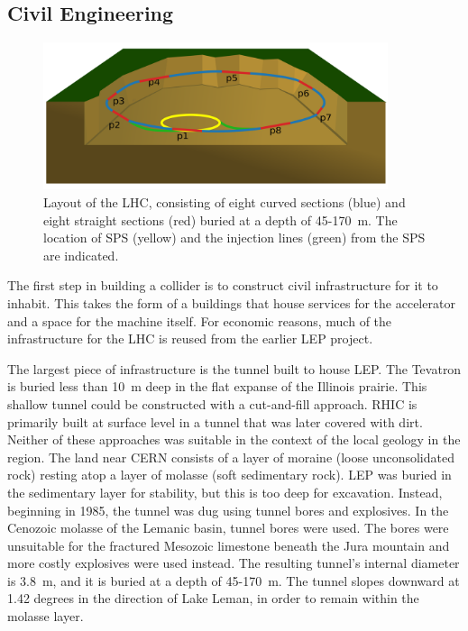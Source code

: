 \subsection{Civil Engineering}

\begin{figure}[htb]
\captionsetup[subfigure]{position=b}
\centering
\includegraphics[width=0.9\textwidth]{figures/experiment/lhc/lhcMap.pdf}
\caption{Layout of the LHC, consisting of eight curved sections (blue) and eight straight sections (red) buried at a depth of 45-170~m. The location of SPS (yellow) and the injection lines (green) from the SPS are indicated.}
\label{figure:lhcLayout}
\end{figure}


The first step in building a collider is to construct civil infrastructure for it to inhabit.
This takes the form of a buildings that house services for the accelerator and a space for the machine itself.
For economic reasons, much of the infrastructure for the LHC is reused from the earlier LEP project.

The largest piece of infrastructure is the tunnel built to house LEP.
The Tevatron is buried less than 10~m deep in the flat expanse of the Illinois prairie.
This shallow tunnel could be constructed with a cut-and-fill approach.
RHIC is primarily built at surface level in a tunnel that was later covered with dirt.
Neither of these approaches was suitable in the context of the local geology in the region.
The land near CERN consists of a layer of moraine (loose unconsolidated rock) resting atop a layer of molasse (soft sedimentary rock).
LEP was buried in the sedimentary layer for stability, but this is too deep for excavation.
Instead, beginning in 1985, the tunnel was dug using tunnel bores and explosives.
In the Cenozoic molasse of the Lemanic basin, tunnel bores were used.
The bores were unsuitable for the fractured Mesozoic limestone beneath the Jura mountain and more costly explosives were used instead.
The resulting tunnel's internal diameter is 3.8~m, and it is buried at a depth of 45-170~m.
The tunnel slopes downward at 1.42 degrees in the direction of Lake Leman, in order to remain within the molasse layer.


